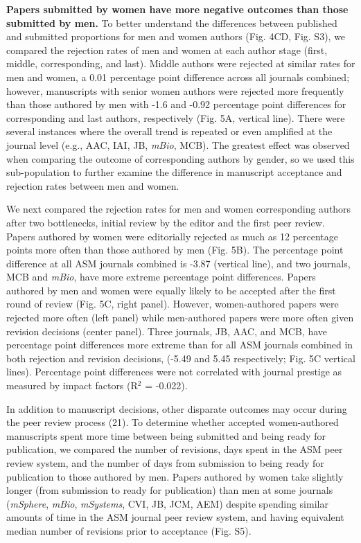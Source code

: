 \documentclass[11pt,]{article}
\begin{document}
\textbf{Papers submitted by women have more negative outcomes than those
submitted by men.} To better understand the differences between
published and submitted proportions for men and women authors (Fig. 4CD,
Fig. S3), we compared the rejection rates of men and women at each
author stage (first, middle, corresponding, and last). Middle authors
were rejected at similar rates for men and women, a 0.01 percentage
point difference across all journals combined; however, manuscripts with
senior women authors were rejected more frequently than those authored
by men with -1.6 and -0.92 percentage point differences for
corresponding and last authors, respectively (Fig. 5A, vertical line).
There were several instances where the overall trend is repeated or even
amplified at the journal level (e.g., AAC, IAI, JB, \emph{mBio}, MCB).
The greatest effect was observed when comparing the outcome of
corresponding authors by gender, so we used this sub-population to
further examine the difference in manuscript acceptance and rejection
rates between men and women.

We next compared the rejection rates for men and women corresponding
authors after two bottlenecks, initial review by the editor and the
first peer review. Papers authored by women were editorially rejected as
much as 12 percentage points more often than those authored by men (Fig.
5B). The percentage point difference at all ASM journals combined is
-3.87 (vertical line), and two journals, MCB and \emph{mBio}, have more
extreme percentage point differences. Papers authored by men and women
were equally likely to be accepted after the first round of review (Fig.
5C, right panel). However, women-authored papers were rejected more
often (left panel) while men-authored papers were more often given
revision decisions (center panel). Three journals, JB, AAC, and MCB,
have percentage point differences more extreme than for all ASM journals
combined in both rejection and revision decisions, (-5.49 and 5.45
respectively; Fig. 5C vertical lines). Percentage point differences were
not correlated with journal prestige as measured by impact factors
(R\({^2}\) = -0.022).

In addition to manuscript decisions, other disparate outcomes may occur
during the peer review process (21). To determine whether accepted
women-authored manuscripts spent more time between being submitted and
being ready for publication, we compared the number of revisions, days
spent in the ASM peer review system, and the number of days from
submission to being ready for publication to those authored by men.
Papers authored by women take slightly longer (from submission to ready
for publication) than men at some journals (\emph{mSphere}, \emph{mBio},
\emph{mSystems}, CVI, JB, JCM, AEM) despite spending similar amounts of
time in the ASM journal peer review system, and having equivalent median
number of revisions prior to acceptance (Fig. S5).
\end{document}
